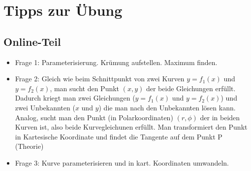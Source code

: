 \documentclass[11pt]{article} %
\begin{document}
\section{Tipps zur Übung}

\subsection{Online-Teil}
\begin{itemize}
\item Frage 1: Parameterisierung. Krümung aufstellen. Maximum finden.
\item Frage 2: Gleich wie beim Schnittpunkt von zwei Kurven  $y=f_1(x)$ und $y = f_2(x)$, man sucht den Punkt $(x,y)$ der beide Gleichungen erfüllt. Dadurch kriegt man zwei Gleichungen ($y=f_1(x)$ und $y = f_2(x)$) und zwei Unbekannten ($x$ und $y$) die man nach den Unbekannten lösen kann. Analog, sucht man den Punkt (in Polarkoordinaten) $(r,\phi)$ der in beiden Kurven ist, also beide Kurvegleichunen erfüllt. Man transformiert den Punkt in Kartesische Koordinate und findet die Tangente auf dem Punkt P (Theorie)
\item Frage 3: Kurve parameterisieren und in kart. Koordinaten umwandeln.  
\end{itemize}
\end{document}
